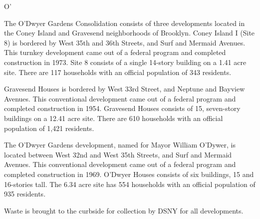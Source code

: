 O'\par \vspace{.7\baselineskip}The O'Dwyer Gardens Consolidation consists of three developments located in the Coney Island and Gravesend neighborhoods of Brooklyn. Coney Island I (Site 8) is bordered by West 35th and 36th Streets, and Surf and Mermaid Avenues. This turnkey development came out of a federal program and completed construction in 1973. Site 8 consists of a single 14-story building on a 1.41 acre site. There are 117 households with an official population of 343 residents.\par \vspace{.7\baselineskip}Gravesend Houses is bordered by West 33rd Street, and Neptune and Bayview Avenues. This conventional development came out of a federal program and completed construction in 1954. Gravesend Houses consists of 15, seven-story buildings on a 12.41 acre site. There are 610 households with an official population of 1,421 residents. \par \vspace{.7\baselineskip}The O'Dwyer Gardens development, named for Mayor William O'Dywer, is located between West 32nd and West 35th Streets, and Surf and Mermaid Avenues. This conventional development came out of a federal program and completed construction in 1969. O'Dwyer Houses consists of six buildings, 15 and 16-stories tall. The 6.34 acre site has 554 households with an official population of 935 residents.\par \vspace{.7\baselineskip}Waste is brought to the curbside for collection by DSNY for all developments.